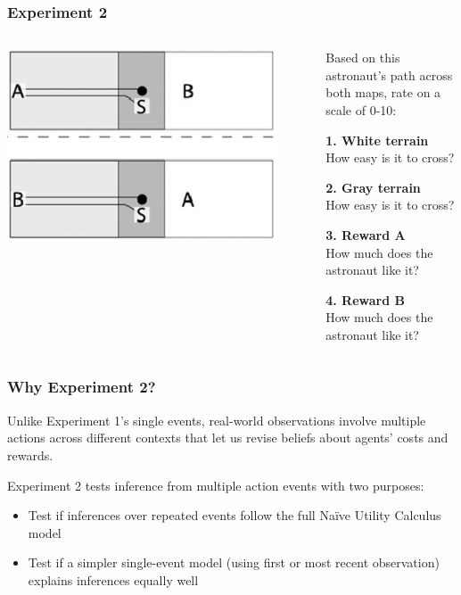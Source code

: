 \documentclass{beamer}
\begin{document}
\begin{frame}
\frametitle{Experiment 2}
\begin{columns}
\begin{column}{0.5\textwidth}
\begin{center}
\includegraphics[width=0.9\textwidth]{experiment2-1.png}
\end{center}
\end{column}
\begin{column}{0.5\textwidth}
Based on this astronaut's path across both maps, rate on a scale of 0-10:

\vspace{0.2cm}
\textbf{1. White terrain}\\
How easy is it to cross?
\vspace{0.2cm}

\textbf{2. Gray terrain}\\
How easy is it to cross?
\vspace{0.2cm}

\textbf{3. Reward A}\\
How much does the astronaut like it?
\vspace{0.2cm}

\textbf{4. Reward B}\\
How much does the astronaut like it?
\end{column}
\end{columns}
\end{frame}

\begin{frame}
\frametitle{Why Experiment 2?}
Unlike Experiment 1's single events, real-world observations involve multiple actions across different contexts that let us revise beliefs about agents' costs and rewards.

\vspace{0.3cm}
Experiment 2 tests inference from multiple action events with two purposes:

\vspace{0.3cm}
\begin{itemize}
    \item Test if inferences over repeated events follow the full Naïve Utility Calculus model
    \item Test if a simpler single-event model (using first or most recent observation) explains inferences equally well
\end{itemize}
\end{frame}
\end{document}
